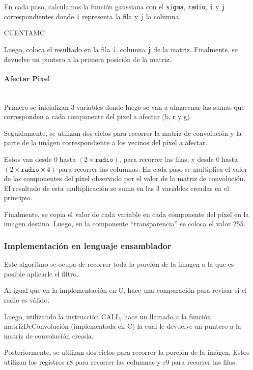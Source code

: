         En cada paso, calculamos la función gaussiana con el \texttt{sigma}, \texttt{radio}, \texttt{i} y \texttt{j} correspondientes donde \texttt{i} representa la fila y \texttt{j} la columna.  
        
        CUENTAMC
    
        Luego, coloca el resultado en la fila \texttt{i}, columna \texttt{j} de la matriz. Finalmente, se devuelve un puntero a la primera posición de la matriz.

      \paragraph{Afectar Pixel} \mbox{} \\
        Primero se inicializan 3 variables donde luego se van a almacenar las sumas que corresponden a cada componente del pixel a afectar (b, r y g). 

        Seguidamente, se utilizan dos ciclos para recorrer la matriz de convolución y la parte de la imágen correspondiente a los vecinos del píxel a afectar.  
        
        Estos van desde $0$ hasta $(2 \times \mathtt{radio})$, para recorrer las filas, y desde $0$ hasta $(2 \times \mathtt{radio} \times 4)$ para recorrer las columnas. En cada paso se multiplica el valor de las componentes del píxel observado por el valor de la matriz de convolución. El resultado de esta multiplicación se suma en las 3 variables creadas en el principio. 
        
        Finalmente, se copia el valor de cada variable en cada componente del píxel en la imagen destino. Luego, en la componente “transparencia” se coloca el valor 255.  

    \subsubsection{Implementación en lenguaje ensamblador} 
      Este algoritmo se ocupa de recorrer toda la porción de la imagen a la que es posible aplicarle el filtro. 
      
      Al igual que en la implementación en C, hace una comparación para revisar si el radio es válido. 
      
      Luego, utilizando la instrucción CALL, hace un llamado a la función matrizDeConvolución (implementada en C) la cual le devuelve un puntero a la matriz de convolución creada. 
      
      Posteriormente, se utilizan dos ciclos para recorrer la porción de la imágen. Estos utilizan los registros r8 para recorrer las columnas y r9 para recorrer las filas.
  


